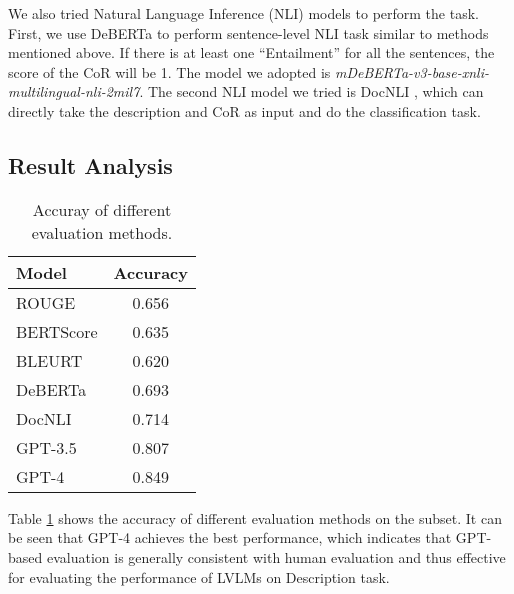 We also tried Natural Language Inference (NLI) models to perform the task. 
First, we use DeBERTa \cite{he2021deberta} to perform sentence-level NLI task similar to methods mentioned above. 
If there is at least one ``Entailment'' for all the sentences, the score of the CoR will be 1.
The model we adopted is \textit{mDeBERTa-v3-base-xnli-multilingual-nli-2mil7}.
The second NLI model we tried is DocNLI \cite{yin-etal-2021-docnli}, which can directly take the description and CoR as input and do the classification task.

\subsection{Result Analysis}

\begin{table}[h!]
  \centering
  \small
  \begin{tabular}{lc}
  \hline
  \textbf{Model} & \textbf{Accuracy}\\ %
  \hline
  ROUGE  & 0.656 \\
  BERTScore & 0.635 \\
  BLEURT & 0.620 \\
  DeBERTa & 0.693 \\
  DocNLI  & 0.714 \\
  GPT-3.5 & 0.807 \\
  GPT-4 & 0.849 \\
  \hline
  \end{tabular}
  \caption{\label{tab:eval_metrics}
  Accuray of different evaluation methods.
  }
\end{table}

Table \ref{tab:eval_metrics} shows the accuracy of different evaluation methods on the subset.
It can be seen that GPT-4 achieves the best performance, which indicates that GPT-based evaluation is generally consistent with human evaluation and thus effective for evaluating the performance of LVLMs on Description task.





